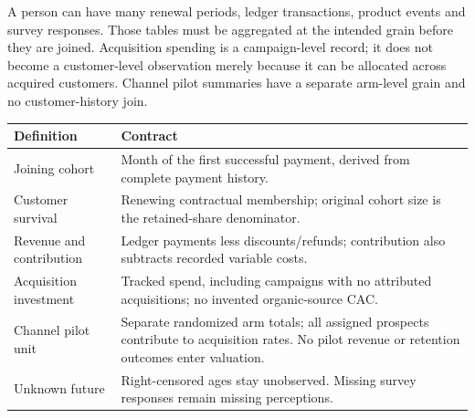 \documentclass[10pt]{article}
\begin{document}
\NewPage
{}
A person can have many renewal periods, ledger transactions, product events and survey responses. Those tables must be aggregated at the intended grain before they are joined. Acquisition spending is a campaign-level record; it does not become a customer-level observation merely because it can be allocated across acquired customers. Channel pilot summaries have a separate arm-level grain and no customer-history join.
\par\begin{tabularx}{\linewidth}{@{}p{.25\linewidth}Y@{}}\toprule
\textbf{Definition} & \textbf{Contract}\\\midrule
Joining cohort & Month of the first successful payment, derived from complete payment history.\\
Customer survival & Renewing contractual membership; original cohort size is the retained-share denominator.\\
Revenue and contribution & Ledger payments less discounts/refunds; contribution also subtracts recorded variable costs.\\
Acquisition investment & Tracked spend, including campaigns with no attributed acquisitions; no invented organic-source CAC.\\
Channel pilot unit & Separate randomized arm totals; all assigned prospects contribute to acquisition rates. No pilot revenue or retention outcomes enter valuation.\\
Unknown future & Right-censored ages stay unobserved. Missing survey responses remain missing perceptions.\\
\bottomrule\end{tabularx}\par
{}
\end{document}
